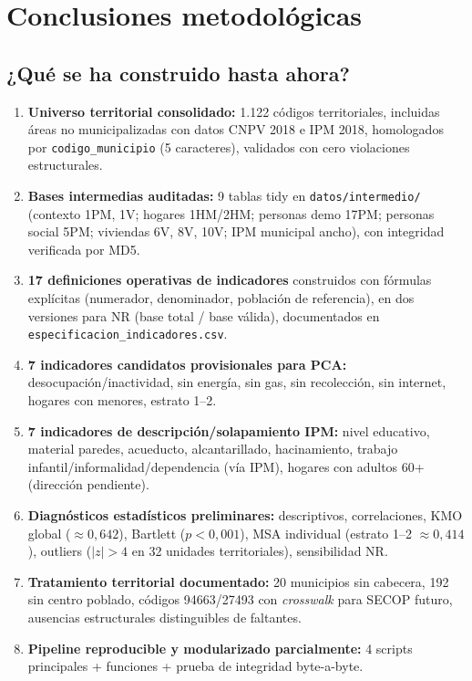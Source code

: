 \section{Conclusiones metodológicas}
\label{ch:conclusiones}

\subsection{¿Qué se ha construido hasta ahora?}

\begin{enumerate}
    \item \textbf{Universo territorial consolidado:} 1.122 códigos territoriales, incluidas áreas no municipalizadas con datos CNPV 2018 e IPM 2018, homologados por \texttt{codigo\_municipio} (5 caracteres), validados con cero violaciones estructurales.
    \item \textbf{Bases intermedias auditadas:} 9 tablas tidy en \texttt{datos/intermedio/} (contexto 1PM, 1V; hogares 1HM/2HM; personas demo 17PM; personas social 5PM; viviendas 6V, 8V, 10V; IPM municipal ancho), con integridad verificada por MD5.
    \item \textbf{17 definiciones operativas de indicadores} construidos con fórmulas explícitas (numerador, denominador, población de referencia), en dos versiones para NR (base total / base válida), documentados en \texttt{especificacion\_indicadores.csv}.
    \item \textbf{7 indicadores candidatos provisionales para PCA:} desocupación/inactividad, sin energía, sin gas, sin recolección, sin internet, hogares con menores, estrato 1--2.
    \item \textbf{7 indicadores de descripción/solapamiento IPM:} nivel educativo, material paredes, acueducto, alcantarillado, hacinamiento, trabajo infantil/informalidad/dependencia (vía IPM), hogares con adultos 60+ (dirección pendiente).
    \item \textbf{Diagnósticos estadísticos preliminares:} descriptivos, correlaciones, KMO global ($\approx 0,642$), Bartlett ($p<0,001$), MSA individual (estrato 1--2 $\approx 0,414$), outliers ($|z|>4$ en 32 unidades territoriales), sensibilidad NR.
    \item \textbf{Tratamiento territorial documentado:} 20 municipios sin cabecera, 192 sin centro poblado, códigos 94663/27493 con \textit{crosswalk} para SECOP futuro, ausencias estructurales distinguibles de faltantes.
    \item \textbf{Pipeline reproducible y modularizado parcialmente:} 4 scripts principales + funciones + prueba de integridad byte-a-byte.
\end{enumerate}

